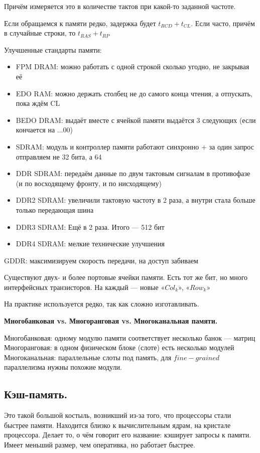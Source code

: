 \documentclass[12pt, a4paper]{article}
\begin{document}
Причём измеряется это в количестве тактов при какой-то заданной частоте.

Если обращаемся к памяти редко, задержка будет $t_{RCD} + t_{CL}$.
Если часто, причём в случайные строки, то $t_{RAS} + t_{RP}$

Улучшенные стандарты памяти: 
\begin{itemize}
    \item FPM DRAM: можно работать с одной строкой сколько угодно, не закрывая её
    \item EDO RAM: можно держать столбец не до самого конца чтения, а отпускать, пока ждём CL
    \item BEDO DRAM: выдаёт вместе с ячейкой памяти выдаётся 3 следующих (если кончается на $…00$)
    \item SDRAM: модуль и контроллер памяти работают синхронно + за один запрос отправляем не 32 бита, а 64
    \item DDR SDRAM: передаём данные по двум тактовым сигналам в противофазе (и по восходящему фронту, и по нисходящему)
    \item DDR2 SDRAM: увеличили тактовую частоту в 2 раза, а внутри стала больше только передающая шина
    \item DDR3 SDRAM: Ещё в 2 раза. Итого — 512 бит
    \item DDR4 SDRAM: мелкие технические улучшения
\end{itemize}

GDDR: максимизируем скорость передачи, на доступ забиваем


Существуют двух- и более портовые ячейки памяти. Есть тот же бит, но много интерфейсных транзисторов.
На каждый — новые «$Col_k$», «$Row_k$»

На практике используется редко, так как сложно изготавливать. 

\textbf{Многобанковая vs. Многоранговая vs. Многоканальная памяти.}

Многобанковая: одному модулю памяти соответствует несколько банок — матриц
Многоранговая: в одном физическом блоке (слоте) есть несколько модулей
Многоканальная: параллельные слоты под память, для $fine-grained$ параллелизма нужны похожие модули.


\subsection{Кэш-память.}

Это такой большой костыль, возникший из-за того, что процессоры стали быстрее памяти.
Находится близко к вычислительным ядрам, на кристале процессора.
Делает то, о чём говорит его название: кэширует запросы к памяти.
Имеет меньший размер, чем оперативка, но работает быстрее.
\end{document}
